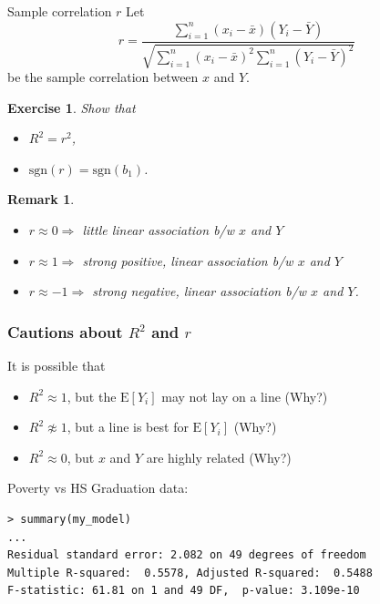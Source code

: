 \documentclass{beamer}
\newcommand{\E}{\mathrm{E}}
\newtheorem{exe}{Exercise}
\newtheorem{remark}{Remark}
\begin{document}
\begin{frame}{Sample correlation $r$}
Let
$$
r=\frac{\sum_{i=1}^n(x_i-\bar{x})(Y_i-\bar{Y})}{\sqrt{\sum_{i=1}^n(x_i-\bar{x})^2\sum_{i=1}^n(Y_i-\bar{Y})^2}}
$$
be the sample correlation between $x$ and $Y$. 

\pause\begin{exe} Show that 
\begin{itemize}
    \item $R^2=r^2$,
    \item $\mathrm{sgn}(r)=\mathrm{sgn}(b_1)$.
\end{itemize}
\end{exe}

\pause\begin{remark}
\begin{itemize}
\item $r\approx 0\Rightarrow$ little linear association b/w $x$ and $Y$
\item $r\approx 1\Rightarrow$ strong positive, linear association b/w $x$ and $Y$
\item $r\approx -1\Rightarrow$ strong negative, linear association b/w $x$ and $Y$.
\end{itemize}
\end{remark}
\end{frame}

\begin{frame}[fragile]
\frametitle{Cautions about $R^2$ and $r$}
It is possible that
\begin{itemize}
\item $R^2\approx 1$, but the $\E[Y_i]$ may not lay on a line (Why?)
\item\pause $R^2\not\approx1$, but a line is best for $\E[Y_i]$ (Why?)
\item\pause $R^2\approx 0$, but $x$ and $Y$ are highly related (Why?)
\end{itemize}

\vspace{20pt}
\pause Poverty vs HS Graduation data:
\begin{small}
\begin{verbatim}
> summary(my_model)
...
Residual standard error: 2.082 on 49 degrees of freedom
Multiple R-squared:  0.5578, Adjusted R-squared:  0.5488 
F-statistic: 61.81 on 1 and 49 DF,  p-value: 3.109e-10
\end{verbatim}
\end{small}
\end{frame}
\end{document}
